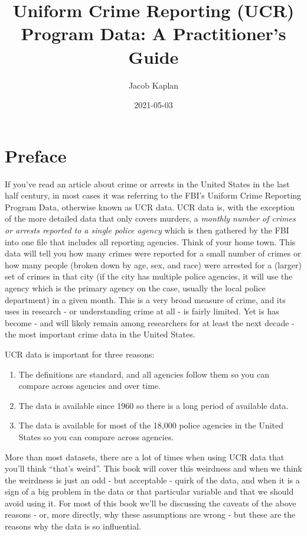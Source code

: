 \documentclass[
  12pt,
  openany]{book}
\title{Uniform Crime Reporting (UCR) Program Data: A Practitioner's Guide}
\author{Jacob Kaplan}
\date{2021-05-03}
\providecommand{\tightlist}{%
  \setlength{\itemsep}{0pt}\setlength{\parskip}{0pt}}
\begin{document}
\maketitle

{
\hypersetup{linkcolor=}
\setcounter{tocdepth}{2}
\tableofcontents
}
\listoffigures
{}
\hypertarget{preface}{%
\chapter{Preface}\label{preface}}

If you've read an article about crime or arrests in the United States in the last half century, in most cases it was referring to the FBI's Uniform Crime Reporting Program Data, otherwise known as UCR data. UCR data is, with the exception of the more detailed data that only covers murders, a \emph{monthly number of crimes or arrests reported to a single police agency} which is then gathered by the FBI into one file that includes all reporting agencies. Think of your home town. This data will tell you how many crimes were reported for a small number of crimes or how many people (broken down by age, sex, and race) were arrested for a (larger) set of crimes in that city (if the city has multiple police agencies, it will use the agency which is the primary agency on the case, usually the local police department) in a given month. This is a very broad measure of crime, and its uses in research - or understanding crime at all - is fairly limited. Yet is has become - and will likely remain among researchers for at least the next decade - the most important crime data in the United States.

UCR data is important for three reasons:

\begin{enumerate}
\def\labelenumi{\arabic{enumi}.}
\tightlist
\item
  The definitions are standard, and all agencies follow them so you can compare across agencies and over time.
\item
  The data is available since 1960 so there is a long period of available data.
\item
  The data is available for most of the 18,000 police agencies in the United States so you can compare across agencies.
\end{enumerate}

More than most datasets, there are a lot of times when using UCR data that you'll think ``that's weird''. This book will cover this weirdness and when we think the weirdness is just an odd - but acceptable - quirk of the data, and when it is a sign of a big problem in the data or that particular variable and that we should avoid using it. For most of this book we'll be discussing the caveats of the above reasons - or, more directly, why these assumptions are wrong - but these are the reasons why the data is so influential.
\end{document}
